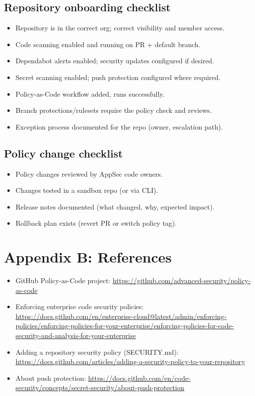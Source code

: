 \documentclass[11pt]{article}
\begin{document}
\subsection{Repository onboarding checklist}

\begin{itemize}[leftmargin=*]
  \item Repository is in the correct org; correct visibility and member access.
  \item Code scanning enabled and running on PR + default branch.
  \item Dependabot alerts enabled; security updates configured if desired.
  \item Secret scanning enabled; push protection configured where required.
  \item Policy-as-Code workflow added, runs successfully.
  \item Branch protections/rulesets require the policy check and reviews.
  \item Exception process documented for the repo (owner, escalation path).
\end{itemize}

\subsection{Policy change checklist}

\begin{itemize}[leftmargin=*]
  \item Policy changes reviewed by AppSec code owners.
  \item Changes tested in a sandbox repo (or via CLI).
  \item Release notes documented (what changed, why, expected impact).
  \item Rollback plan exists (revert PR or switch policy tag).
\end{itemize}

\section{Appendix B: References}

\begin{itemize}[leftmargin=*]
  \item GitHub Policy-as-Code project: \url{https://github.com/advanced-security/policy-as-code}
  \item Enforcing enterprise code security policies: \url{https://docs.github.com/en/enterprise-cloud@latest/admin/enforcing-policies/enforcing-policies-for-your-enterprise/enforcing-policies-for-code-security-and-analysis-for-your-enterprise}
  \item Adding a repository security policy (SECURITY.md): \url{https://docs.github.com/articles/adding-a-security-policy-to-your-repository}
  \item About push protection: \url{https://docs.github.com/en/code-security/concepts/secret-security/about-push-protection}
\end{itemize}
\end{document}

